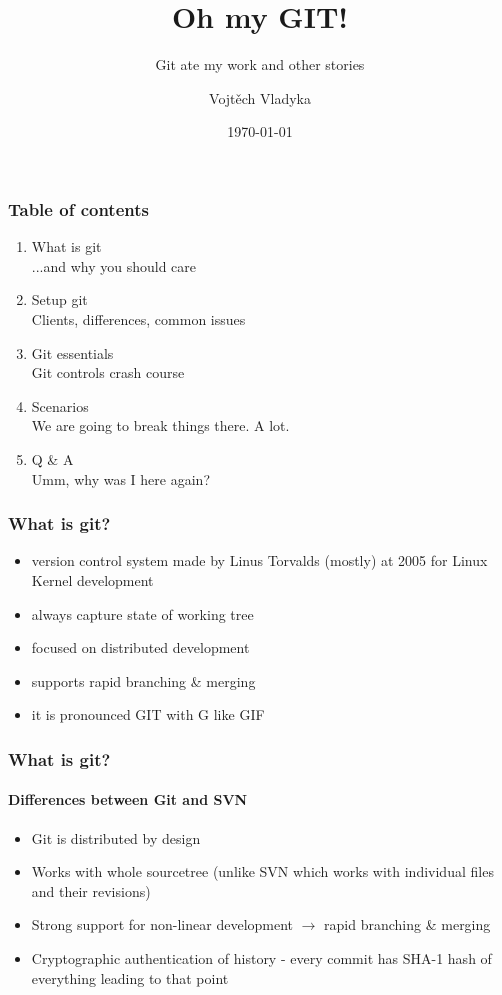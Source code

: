 \documentclass[aspectratio=169]{beamer}
\title{Oh my GIT!}
\subtitle{Git ate my work and other stories}
\author{Vojtěch Vladyka}
\date{\today}
\begin{document}
    \frame{\titlepage}
    \begin{frame}
       \frametitle{Table of contents}
       \begin{enumerate}
           \item What is git
           \\   \textcolor{solarizedRebase01}{\footnotesize\hspace{1em} ...and why you should care}	
           \item Setup git
           \\   \textcolor{solarizedRebase01}{\footnotesize\hspace{1em} Clients, differences, common issues}	
           \item Git essentials
           \\   \textcolor{solarizedRebase01}{\footnotesize\hspace{1em} Git controls crash course}	
           \item Scenarios
           \\   \textcolor{solarizedRebase01}{\footnotesize\hspace{1em} We are going to break things there. A lot.}	
           \item Q \& A
           \\   \textcolor{solarizedRebase01}{\footnotesize\hspace{1em} Umm, why was I here again?}
       \end{enumerate}
    \end{frame}

    \begin{frame}
        \frametitle{What is git?}
        \begin{itemize}
            \item version control system made by Linus Torvalds (mostly) at 2005 for Linux Kernel development
            \item always capture state of working tree
            \item focused on distributed development
            \item supports rapid branching \& merging
            \item it is pronounced GIT with G like GIF ~
        \end{itemize}
    \end{frame}
    \begin{frame}
        \frametitle{What is git?}
        \framesubtitle{Differences between Git and SVN}
        \begin{itemize}
            \item Git is distributed by design
            \item Works with whole sourcetree (unlike SVN which works with individual files and their revisions)
            \item Strong support for non-linear development $\rightarrow$ rapid branching \& merging
            \item Cryptographic authentication of history - every commit has SHA-1 hash of everything leading to that point
        \end{itemize}
    \end{frame}
    
\end{document}
